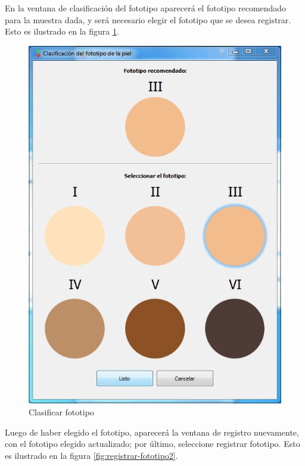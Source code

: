 		En la ventana de clasificaci\'{o}n del fototipo aparecer\'{a} el fototipo recomendado para la muestra dada, y ser\'{a} necesario elegir el fototipo que se desea registrar. Esto es ilustrado en la figura \ref{fig:clasificar-fototipo}.
\newpage
\null
\vfill
\begin{figure}[H]
  \centering
  \includegraphics[width=.8\linewidth]{./img/fototipo.jpg}
\caption[]{Clasificar fototipo\label{fig:clasificar-fototipo}}
\end{figure}
\vfill
\newpage
	Luego de haber elegido el fototipo, aparecer\'{a} la ventana de registro nuevamente, con el fototipo elegido actualizado; por \'{u}ltimo, seleccione registrar fototipo. Esto es ilustrado en la figura \ref{fig:registrar-fototipo2}.
\vfill
